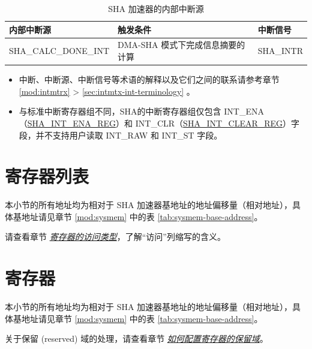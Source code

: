 \documentclass[main\_\_CN.tex]{subfiles}
\begin{document}
\begin{longtable}{ | L{5cm} | L{6.5cm} | L{4cm} | }
\caption{SHA 加速器的内部中断源} \label{tab:sha-int-sources}
\\ \hline
{}
\textbf{内部中断源} & \textbf{触发条件}  &  \textbf{中断信号}\\ \hline
\label{int:SHACALCDONEINT}SHA\_CALC\_DONE\_INT  &  DMA-SHA 模式下完成信息摘要的计算 &  SHA\_INTR  \\ \hline
\end{longtable}


\clearpage
\begin{tiplisting}
\vspace{-2.5em}
\begin{itemize}
    \item 中断、中断源、中断信号等术语的解释以及它们之间的联系请参考章节 \ref{mod:intmtrx} \textit{} > \ref{sec:intmtx-int-terminology} \textit{}。
    \item 与标准中断寄存器组不同，SHA的中断寄存器组仅包含 INT\_ENA（\hyperref[regdesc:SHAINTENAREG]{SHA\_INT\_ENA\_REG}）和 INT\_CLR（\hyperref[regdesc:SHAINTCLEARREG]{SHA\_\-INT\_\-CLEAR\_\-REG}）字段，并不支持用户读取 INT\_RAW 和 INT\_ST 字段。
\end{itemize}
\end{tiplisting}





\newpage
\hypertarget{sha-reg-summ}{}
\section{寄存器列表}
\label{sec:sha-reg-summ}


本小节的所有地址均为相对于 SHA 加速器基地址的地址偏移量（相对地址），具体基地址请见章节 \ref{mod:sysmem} \textit{} 中的表 \ref{tab:sysmem-base-address}。

请查看章节 \hyperref[glossary-access-types]{\textit{寄存器的访问类型}}，了解“访问”列缩写的含义。






\newpage
\section{寄存器}

本小节的所有地址均为相对于 SHA 加速器基地址的地址偏移量（相对地址），具体基地址请见章节 \ref{mod:sysmem} \textit{} 中的表 \ref{tab:sysmem-base-address}。

关于保留 (reserved) 域的处理，请查看章节 \hyperref[programming-reserved-field]{\textit{如何配置寄存器的保留域}}。


\end{document}
